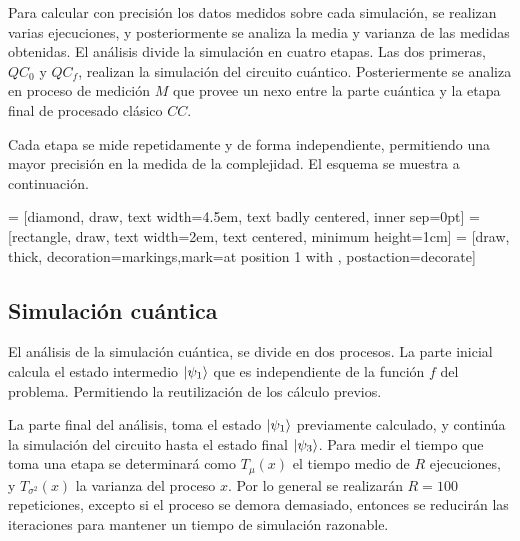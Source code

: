 Para calcular con precisión los datos medidos sobre cada simulación, se realizan 
varias ejecuciones, y posteriormente se analiza la media y varianza de las 
medidas obtenidas. El análisis divide la simulación en cuatro etapas. Las dos 
primeras, $QC_0$ y $QC_f$, realizan la simulación del circuito cuántico.  
Posteriermente se analiza en proceso de medición $M$ que provee un nexo entre la 
parte cuántica y la etapa final de procesado clásico $CC$.

Cada etapa se mide repetidamente y de forma independiente, permitiendo una mayor 
precisión en la medida de la complejidad. El esquema se muestra a continuación.
%
\begin{center}
 = [diamond, draw, text width=4.5em, text badly centered, 
inner sep=0pt]
 = [rectangle, draw, text width=2em, text centered, minimum 
height=1cm]
 = [draw, thick, decoration={markings,mark=at position 
1 with {}}, postaction={decorate}]
%
\end{center}
%

\subsection{Simulación cuántica}
El análisis de la simulación cuántica, se divide en dos procesos. La parte 
inicial calcula el estado intermedio $\ket{\psi_{1}}$ que es independiente de la 
función $f$ del problema. Permitiendo la reutilización de los cálculo previos.

La parte final del análisis, toma el estado $\ket{\psi_{1}}$ previamente calculado, y 
continúa la simulación del circuito hasta el estado final $\ket{\psi_{3}}$. Para medir 
el tiempo que toma una etapa se determinará como $T_\mu(x)$ el tiempo medio de 
$R$ ejecuciones, y $T_{\sigma^2}(x)$ la varianza del proceso $x$. Por lo general 
se realizarán $R = 100$ repeticiones, excepto si el proceso se demora demasiado, 
entonces se reducirán las iteraciones para mantener un tiempo de simulación 
razonable.

